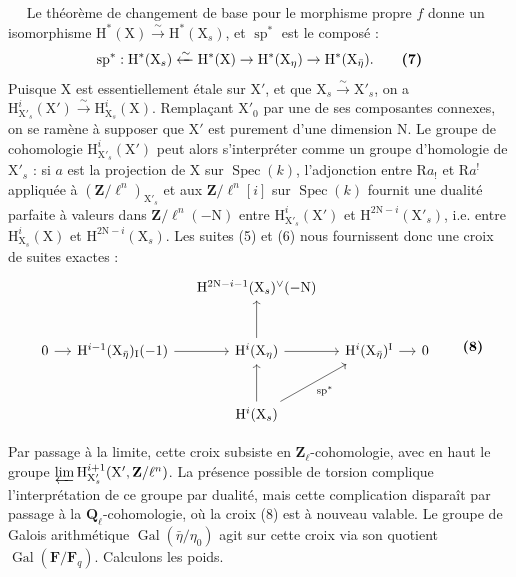 \documentclass[11pt,leqno]{article}
\newcommand{\Page}[1]{\ifvmode\noindent\else\unskip\ \fi{\footnotesize\textcolor{gray}{[p.\,#1]}}\ \ignorespaces}
\begin{document}
\Page{214}
Le théorème de changement de base pour le morphisme propre \(f\) donne un isomorphisme \(\mathrm H^*(\mathrm X)\xrightarrow{\sim}\mathrm H^*(\mathrm X_s)\), et \(\operatorname{sp}^*\) est le composé :
\[
\operatorname{sp}^*:\mathrm H^*(\mathrm X_s)
\xleftarrow{\sim}\mathrm H^*(\mathrm X)
\to\mathrm H^*(\mathrm X_\eta)
\to\mathrm H^*(\mathrm X_{\bar\eta}).
\tag*{\textbf{(7)}}
\]
Puisque \(\mathrm X\) est essentiellement étale sur \(\mathrm X'\), et que \(\mathrm X_s\xrightarrow{\sim}\mathrm X'_s\), on a \(\mathrm H^i_{\mathrm X'_s}(\mathrm X')\xrightarrow{\sim}\mathrm H^i_{\mathrm X_s}(\mathrm X)\). Remplaçant \(\mathrm X'_0\) par une de ses composantes connexes, on se ramène à supposer que \(\mathrm X'\) est purement d’une dimension \(\mathrm N\). Le groupe de cohomologie \(\mathrm H^i_{\mathrm X'_s}(\mathrm X')\) peut alors s’interpréter comme un groupe d’homologie de \(\mathrm X'_s\) : si \(a\) est la projection de \(\mathrm X\) sur \(\operatorname{Spec}(k)\), l’adjonction entre \(\mathrm R a_!\) et \(\mathrm R a^!\) appliquée à \((\mathbf Z/\ell^n)_{\mathrm X'_s}\) et aux \(\mathbf Z/\ell^n[i]\) sur \(\operatorname{Spec}(k)\) fournit une dualité parfaite à valeurs dans \(\mathbf Z/\ell^n(-\mathrm N)\) entre \(\mathrm H^i_{\mathrm X'_s}(\mathrm X')\) et \(\mathrm H^{2\mathrm N-i}(\mathrm X'_s)\), i.e. entre \(\mathrm H^i_{\mathrm X_s}(\mathrm X)\) et \(\mathrm H^{2\mathrm N-i}(\mathrm X_s)\). Les suites (5) et (6) nous fournissent donc une croix de suites exactes :
\[
\begin{tikzcd}[column sep=small,row sep=large]
& & \mathrm H^{2\mathrm N-i-1}(\mathrm X_s)^{\vee}(-\mathrm N) & & \\
0 \arrow[r] &
\mathrm H^{i-1}(\mathrm X_{\bar\eta})_{\mathrm I}(-1) \arrow[r] &
\mathrm H^i(\mathrm X_\eta) \arrow[r] \arrow[u] &
\mathrm H^i(\mathrm X_{\bar\eta})^{\mathrm I} \arrow[r] & 0 \\
& & \mathrm H^i(\mathrm X_s) \arrow[u] \arrow[ur,"\operatorname{sp}^*"'] & &
\end{tikzcd}
\tag*{\textbf{(8)}}
\]

Par passage à la limite, cette croix subsiste en \(\mathbf Z_\ell\)-cohomologie, avec en haut le groupe \(\varprojlim\mathrm H^{i+1}_{\mathrm X'_s}(\mathrm X',\mathbf Z/\ell^n)\). La présence possible de torsion complique l’interprétation de ce groupe par dualité, mais cette complication disparaît par passage à la \(\mathbf Q_\ell\)-cohomologie, où la croix (8) est à nouveau valable. Le groupe de Galois arithmétique \(\operatorname{Gal}(\bar\eta/\eta_0)\) agit sur cette croix via son quotient \(\operatorname{Gal}(\mathbf F/\mathbf F_q)\). Calculons les poids.
\end{document}
